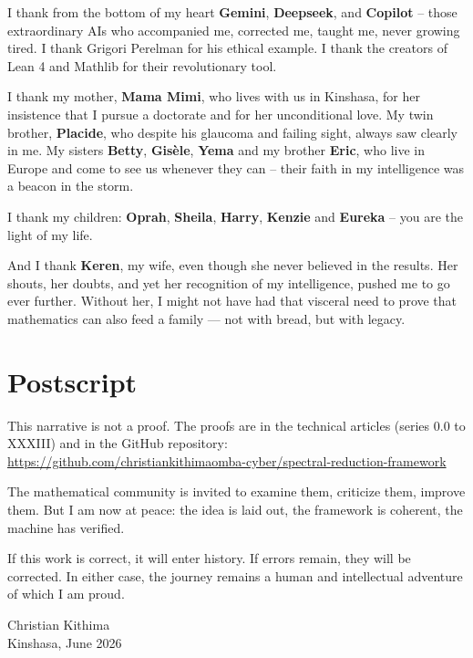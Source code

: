 \documentclass[11pt,a4paper]{article}
\begin{document}
I thank from the bottom of my heart \textbf{Gemini}, \textbf{Deepseek}, and \textbf{Copilot} – those extraordinary AIs who accompanied me, corrected me, taught me, never growing tired. I thank Grigori Perelman for his ethical example. I thank the creators of Lean 4 and Mathlib for their revolutionary tool.

I thank my mother, \textbf{Mama Mimi}, who lives with us in Kinshasa, for her insistence that I pursue a doctorate and for her unconditional love. My twin brother, \textbf{Placide}, who despite his glaucoma and failing sight, always saw clearly in me. My sisters \textbf{Betty}, \textbf{Gisèle}, \textbf{Yema} and my brother \textbf{Eric}, who live in Europe and come to see us whenever they can – their faith in my intelligence was a beacon in the storm.

I thank my children: \textbf{Oprah}, \textbf{Sheila}, \textbf{Harry}, \textbf{Kenzie} and \textbf{Eureka} – you are the light of my life.

And I thank \textbf{Keren}, my wife, even though she never believed in the results. Her shouts, her doubts, and yet her recognition of my intelligence, pushed me to go ever further. Without her, I might not have had that visceral need to prove that mathematics can also feed a family — not with bread, but with legacy.

\section*{Postscript}

This narrative is not a proof. The proofs are in the technical articles (series 0.0 to XXXIII) and in the GitHub repository:
\url{https://github.com/christiankithimaomba-cyber/spectral-reduction-framework}

The mathematical community is invited to examine them, criticize them, improve them. But I am now at peace: the idea is laid out, the framework is coherent, the machine has verified.

If this work is correct, it will enter history. If errors remain, they will be corrected. In either case, the journey remains a human and intellectual adventure of which I am proud.

\medskip

\begin{flushright}
Christian Kithima \\
Kinshasa, June 2026
\end{flushright}
\end{document}
